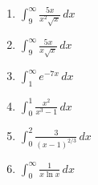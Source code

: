 \documentclass{article}
\begin{document}
\begin{enumerate}
                        \begin{enumerate}
                            \item $\displaystyle \int_9^\infty \frac{5x}{x^2\sqrt{x}}\,dx$
                            \item $\displaystyle \int_9^\infty \frac{5x}{x\sqrt{x}}\,dx$
                            \item $\displaystyle \int_1^\infty e^{-7x}\, dx$
                            \item $\displaystyle \int_{0}^1 \frac{x^2}{x^3-1}\, dx$
                            \item $\displaystyle \int_{0}^2 \frac {3}{(x-1)^{2/3}}\, dx$
                            \item $\displaystyle \int_0^\infty \frac{1}{x\ln{x}}\,dx$
                        \end{enumerate}
                \end{enumerate}
                
\end{document}
